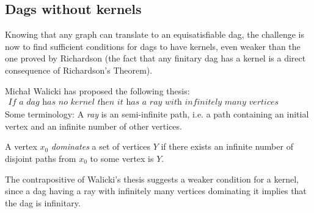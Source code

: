 
\subsection{Dags without kernels}
\label{sub:Dags without kernels}
Knowing that any graph can translate to an equisatisfiable dag, the challenge is now to find sufficient conditions for dags to have kernels, even weaker than the one proved by Richardson (the fact that any finitary dag has a kernel is a direct consequence of Richardson's Theorem).

Michał Walicki has proposed the following thesis:
\begin{align}
  \textit{If a dag has no kernel then it has a ray with infinitely many vertices dominating it.}
\end{align}
Some terminology:
A \textit{ray} is an semi-infinite path, i.e. a path containing an initial vertex and an infinite number of other vertices.

A vertex $x_0$ \textit{dominates} a set of vertices $Y$ if there exists an infinite number of disjoint paths from $x_0$ to some vertex is $Y$.

The contrapositive of Walicki's thesis suggests a weaker condition for a kernel, since a dag having a ray with infinitely many vertices dominating it implies that the dag is infinitary.
